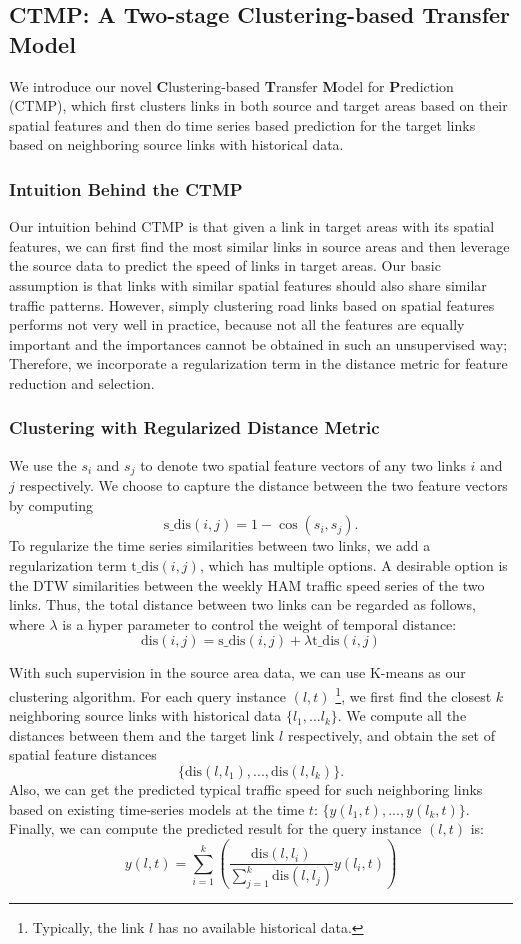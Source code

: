 \subsection{CTMP: A Two-stage Clustering-based Transfer Model }
We introduce our novel \textbf{C}lustering-based \textbf{T}ransfer \textbf{M}odel for \textbf{P}rediction  (CTMP), which first clusters links in both source and target areas based on their spatial features and then do time series based prediction for the target links based on neighboring source links with historical data.

\subsubsection{Intuition Behind the CTMP}
Our intuition behind CTMP is that given a link in target areas with its spatial features, we can first find the most similar links in source areas and then leverage the source data to predict the speed of links in target areas.
Our basic assumption is that links with similar spatial features should also share similar traffic patterns.
However, simply clustering road links based on spatial features performs not very well in practice, because not all the features are equally important and the importances cannot be obtained in such an unsupervised way; 
Therefore, we incorporate a regularization term in the distance metric for feature reduction and selection.

\subsubsection{Clustering with Regularized Distance Metric}
We use the $s_i$ and $s_j$ to denote two spatial feature vectors of any two links $i$ and $j$ respectively. 
We choose to capture the distance between the two feature vectors by computing $$\text{s\_dis}(i,j) = 1-\cos(s_i,s_j).$$
To regularize the time series similarities between two links, we add a regularization term $\text{t\_dis}(i,j)$, which has multiple options.
A desirable option is the DTW similarities between the weekly HAM traffic speed series of the two links.
Thus, the total distance between two links can be regarded as follows, where $\lambda$ is a hyper parameter to control the weight of temporal distance:
$$\text{dis}(i,j) =  \text{s\_dis}(i,j) + \lambda \text{t\_dis}(i,j) $$

With such supervision in the source area data,
we can use K-means as our clustering algorithm.
For each query instance $(l,t)$ \footnote{Typically, the link $l$ has no available historical data.}, we first find the closest $k$ neighboring source links with historical data $\{l_1,...l_k\}$.
We compute all the distances between them and the target link $l$ respectively, and obtain the set of spatial feature distances $$\{\text{dis}(l,l_1),...,\text{dis}(l,l_k)\}.$$
Also, we can get the predicted typical traffic speed for such neighboring links based on existing time-series models  at the time $t$: $\{y(l_1,t),...,y(l_k,t)\}$.
Finally, we can compute the predicted result for the query instance $(l,t)$ is:
$$ y(l,t) = \sum_{i=1}^k \left( \frac{\text{dis}(l,l_i)}{\sum_{j=1}^k \text{dis}(l,l_j)} 
y(l_i,t)
\right)$$ 


